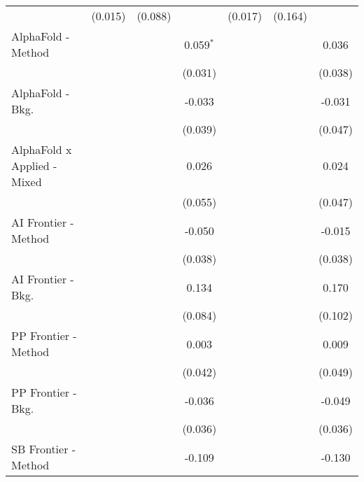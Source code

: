 \begin{tabular}{lcccccc}
                                  & (0.015)      & (0.088)      &                & (0.017)     & (0.164)       &   \\   
   AlphaFold - Method             &              &              & 0.059$^{*}$    &             &               & 0.036\\   
                                  &              &              & (0.031)        &             &               & (0.038)\\   
   AlphaFold - Bkg.               &              &              & -0.033         &             &               & -0.031\\   
                                  &              &              & (0.039)        &             &               & (0.047)\\   
   AlphaFold x Applied - Mixed    &              &              & 0.026          &             &               & 0.024\\   
                                  &              &              & (0.055)        &             &               & (0.047)\\   
   AI Frontier - Method           &              &              & -0.050         &             &               & -0.015\\   
                                  &              &              & (0.038)        &             &               & (0.038)\\   
   AI Frontier - Bkg.             &              &              & 0.134          &             &               & 0.170\\   
                                  &              &              & (0.084)        &             &               & (0.102)\\   
   PP Frontier - Method           &              &              & 0.003          &             &               & 0.009\\   
                                  &              &              & (0.042)        &             &               & (0.049)\\   
   PP Frontier - Bkg.             &              &              & -0.036         &             &               & -0.049\\   
                                  &              &              & (0.036)        &             &               & (0.036)\\   
   SB Frontier - Method           &              &              & -0.109         &             &               & -0.130\\   

\end{tabular}
